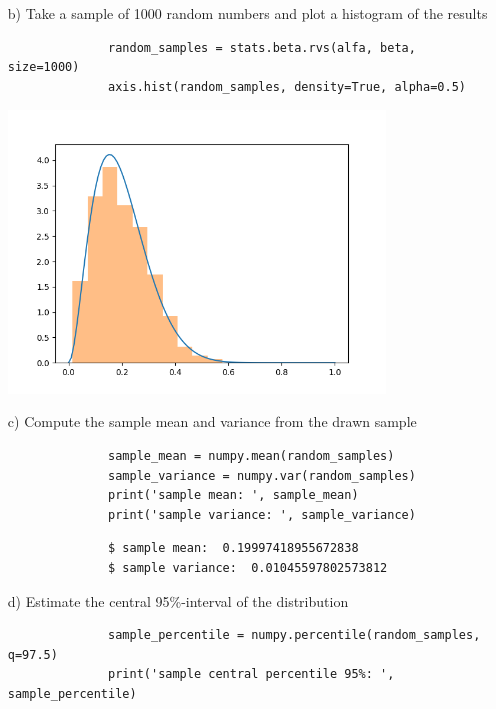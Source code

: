 \documentclass[11pt,a4paper,english]{article}
\begin{document}
\begin{enumerate}
\begin{itemize}
          \item[b)] Take a sample of 1000 random numbers and plot a histogram of the results
            \begin{verbatim}
              random_samples = stats.beta.rvs(alfa, beta, size=1000)
              axis.hist(random_samples, density=True, alpha=0.5)
            \end{verbatim}
            \includegraphics[width=10cm]{prob_distribution_hist.png}

          \item[c)] Compute the sample mean and variance from the drawn sample
            \begin{verbatim}
              sample_mean = numpy.mean(random_samples)
              sample_variance = numpy.var(random_samples)
              print('sample mean: ', sample_mean)
              print('sample variance: ', sample_variance)
            \end{verbatim}

            \begin{verbatim}
              $ sample mean:  0.19997418955672838
              $ sample variance:  0.01045597802573812
            \end{verbatim}

          \item[d)] Estimate the central 95\%-interval of the distribution
            \begin{verbatim}
              sample_percentile = numpy.percentile(random_samples, q=97.5)
              print('sample central percentile 95%: ', sample_percentile)
            \end{verbatim}


\end{itemize}
\end{enumerate}
\end{document}
